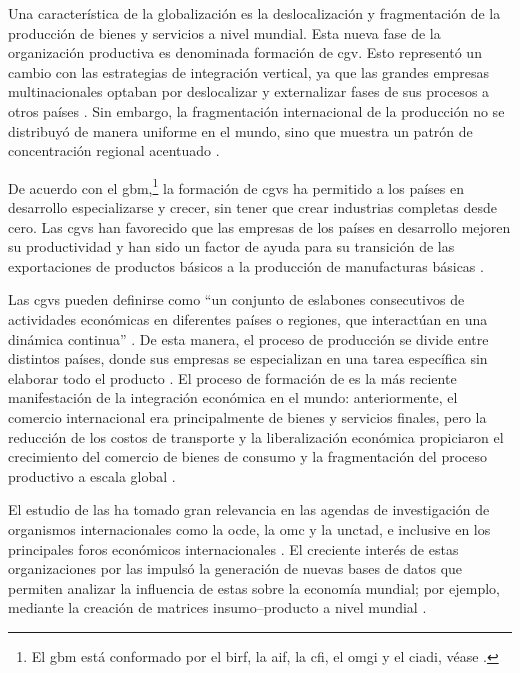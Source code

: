 Una característica de la globalización es la deslocalización y fragmentación de la producción de bienes y servicios a nivel mundial. Esta nueva fase de la organización productiva es denominada formación de \acrfull{cgv}. Esto representó un cambio con las estrategias de integración vertical, ya que las grandes empresas multinacionales optaban por deslocalizar y externalizar fases de sus procesos a otros países \parencite[p.~63]{Perez2019}. Sin embargo, la fragmentación internacional de la producción no se distribuyó de manera uniforme en el mundo, sino que muestra un patrón de concentración regional acentuado \parencite[pp.~30--31]{Porta2017}.

De acuerdo con el \gls{gbm},\footnote{El \acrlong{gbm} está conformado por el \gls{birf}, la \gls{aif}, la \gls{cfi}, el \gls{omgi} y el \gls{ciadi}, véase \textcite{GrupoBancoMundial_QUienesSomos}.} la formación de \glspl{cgv} ha permitido a los países en desarrollo especializarse y crecer, sin tener que crear industrias completas desde cero. Las \glspl{cgv} han favorecido que las empresas de los países en desarrollo mejoren su productividad y han sido un factor de ayuda para su transición de las exportaciones de productos básicos a la producción de manufacturas básicas \parencite{GrupoBancoMundial2019}.

Las \glspl{cgv} pueden definirse como ``un conjunto de eslabones consecutivos de actividades económicas en diferentes países o regiones, que interactúan en una dinámica continua'' \parencite[p.~2]{Ferrando2013}. De esta manera, el proceso de producción se divide entre distintos países, donde sus empresas se especializan en una tarea específica sin elaborar todo el producto \parencite[p.~3]{BancoMundial2020}. El proceso de formación de  es la más reciente manifestación de la integración económica en el mundo: anteriormente, el comercio internacional era principalmente de bienes y servicios finales, pero la reducción de los costos de transporte y la liberalización económica propiciaron el crecimiento del comercio de bienes de consumo y la fragmentación del proceso productivo a escala global \parencite{BancoMexico2016}.

El estudio de las  ha tomado gran relevancia en las agendas de investigación de organismos internacionales como la \gls{ocde}, la \gls{omc} y la \gls{unctad}, e inclusive en los principales foros económicos internacionales \parencite[p.~3]{Dalle2013}. El creciente interés de estas organizaciones por las  impulsó la generación de nuevas bases de datos que permiten analizar la influencia de estas sobre la economía mundial; por ejemplo, mediante la creación de matrices insumo--producto a nivel mundial \parencite[p.~31]{Porta2017}. 

